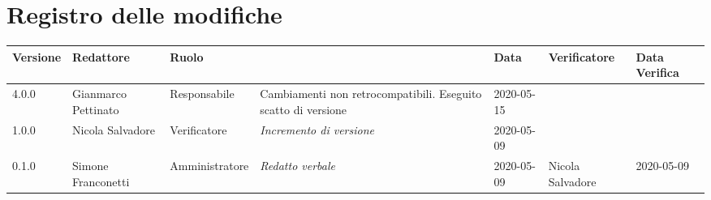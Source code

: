\section*{Registro delle modifiche}
\renewcommand{\arraystretch}{1.8}

  \setlength\LTleft{-1.7cm}
  \begin{longtable}{|p{1.7cm}|p{2cm}|p{2.5cm}|p{3cm}|p{1.7cm}|p{2cm}|p{2.3cm}|}
    \hline

    \rowcolor{header}
    \textbf{Versione} & \textbf{Redattore} & \textbf{Ruolo} & \centering{\textbf{Descrizione}} & \textbf{Data} & \textbf{Verificatore} & \textbf{Data Verifica}\\

    \hline
    4.0.0 & Gianmarco Pettinato & Responsabile & Cambiamenti non retrocompatibili.  Eseguito scatto di versione & 2020-05-15 & &\\
    1.0.0 & Nicola Salvadore & Verificatore & \small{\textit{Incremento di versione}} & 2020-05-09 & &\\
	0.1.0 & Simone Franconetti & Amministratore & \small{\textit{Redatto verbale}} & 2020-05-09 & Nicola Salvadore & 2020-05-09 \\
    \hline
  \end{longtable}
  \setlength\LTleft{0cm}
